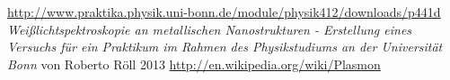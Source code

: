 \url{http://www.praktika.physik.uni-bonn.de/module/physik412/downloads/p441d}
\textit{Weißlichtspektroskopie an metallischen
Nanostrukturen - Erstellung eines Versuchs für ein Praktikum im Rahmen des
Physikstudiums an der Universität Bonn} von Roberto Röll 2013
\url{http://en.wikipedia.org/wiki/Plasmon}


